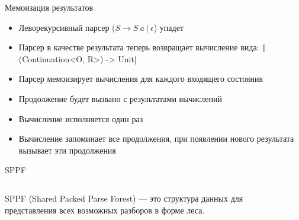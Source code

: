 \documentclass[aspectratio=169]{beamer}
\begin{document}
\begin{frame}[fragile]{Мемоизация результатов}
  \begin{itemize}
    \item Леворекурсивный парсер ($S \to S\ a\ |\ \epsilon$) упадет

    \item Парсер в качестве результата теперь возвращает вычисление вида: \texttt|(Continuation<O, R>) -> Unit|
    \item Парсер мемоизирует вычисления для каждого входящего состояния
    
    \item Продолжение будет вызвано с результатами вычислений
    
    \item Вычисление исполняется один раз

    \item Вычисление запоминает все продолжения, при появлении нового результата вызывает эти продолжения
  \end{itemize}
\end{frame}


\begin{frame}{SPPF}
  \begin{columns}[c]
    \begin{column}{0.5\textwidth}
      SPPF (Shared Packed Parse Forest) --- это структура данных для представления всех возможных разборов в форме леса.
    \end{column}
    \begin{column}{0.55\textwidth}
    \end{column}
  \end{columns}
\end{frame}
\end{document}
